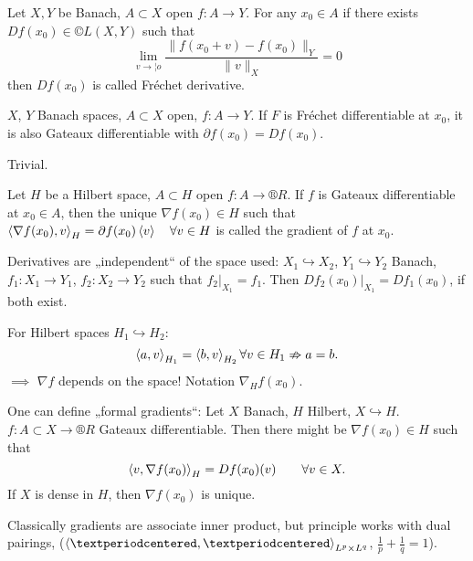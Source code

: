 \documentclass[12pt]{article}					%
\begin{document}
\begin{definice}
	Let $X, Y$ be Banach, $A \subset X$ open $f: A \rightarrow Y$. For any $x_0 \in A$ if there exists $Df(x_0) \in ©L(X, Y)$ such that
	$$ \lim_{v \rightarrow ¦o} \frac{\|f(x_0 + v) - f(x_0)\|_Y}{\|v\|_X} = 0 $$
	then $Df(x_0)$  is called Fréchet derivative.
\end{definice}

\begin{lemma}
	$X$, $Y$ Banach spaces, $A \subset X$ open, $f: A \rightarrow Y$. If $F$ is Fréchet differentiable at $x_0$, it is also Gateaux differentiable with $\partial f(x_0) = D f(x_0)$.

	\begin{dukazin}
		Trivial.
	\end{dukazin}
\end{lemma}

\begin{definice}[Gradient]
	Let $H$ be a Hilbert space, $A \subset H$ open $f: A \rightarrow ®R$. If $f$ is Gateaux differentiable at $x_0 \in A$, then the unique $\nabla  f(x_0) \in H$ such that $\left\langle\nabla f(x_0), v\right\rangle_H = \partial f(x_0) \left\langle v\right\rangle\quad\forall v \in H$ is called the gradient of $f$ at $x_0$.
\end{definice}

\begin{poznamka}
	Derivatives are „independent“ of the space used: $X_1 \hookrightarrow X_2$, $Y_1 \hookrightarrow Y_2$ Banach, $f_1: X_1 \rightarrow Y_1$, $f_2: X_2 \rightarrow Y_2$ such that $f_2|_{X_1} = f_1$. Then $Df_2(x_0)|_{X_1} = Df_1(x_0)$, if both exist.

	For Hilbert spaces $H_1 \hookrightarrow H_2$:
	$$ \left\langle a, v\right\rangle_{H_1} = \left\langle b, v\right\rangle_{H_2} \forall v \in H_1 \nRightarrow a = b. $$
	$\implies$ $\nabla f$ depends on the space! Notation $\nabla_H f(x_0)$.

	One can define „formal gradients“: Let $X$ Banach, $H$ Hilbert, $X \hookrightarrow H$. $f: A \subset X \rightarrow ®R$ Gateaux differentiable. Then there might be $\nabla f(x_0) \in H$ such that
	$$ \left\langle v, \nabla f(x_0)\right\rangle_H = Df(x_0)(v) \qquad \forall v \in X. $$
	If $X$ is dense in $H$, then $\nabla f(x_0)$ is unique.

	Classically gradients are associate inner product, but principle works with dual pairings, ($\<·, ·\>_{L^p \times L^q}$, $\frac{1}{p} + \frac{1}{q} = 1$).
\end{poznamka}
\end{document}
